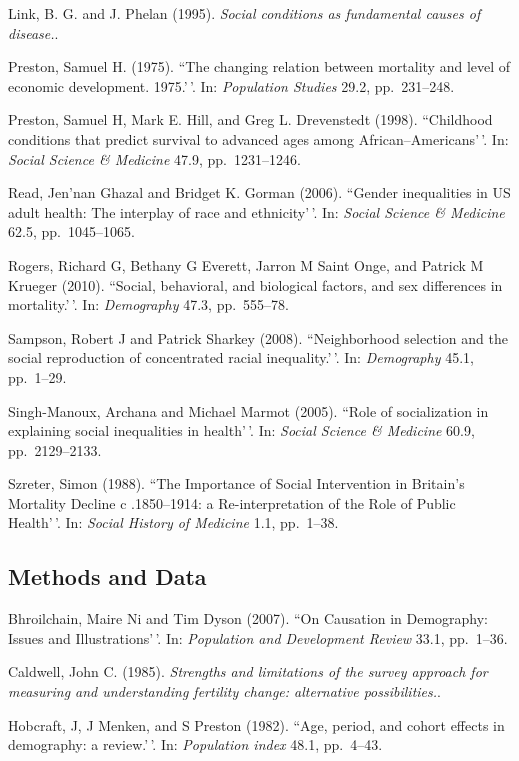 \documentclass[11pt,]{article}
\begin{document}
Link, B. G. and J. Phelan (1995).
\emph{Social conditions as fundamental causes of disease.}.

Preston, Samuel H. (1975). ``The changing relation between mortality and
level of economic development. 1975.'\,'. In: \emph{Population Studies}
29.2, pp.~231--248.

Preston, Samuel H, Mark E. Hill, and Greg L. Drevenstedt (1998).
``Childhood conditions that predict survival to advanced ages among
African--Americans'\,'. In: \emph{Social Science \& Medicine} 47.9,
pp.~1231--1246.

Read, Jen'nan Ghazal and Bridget K. Gorman (2006). ``Gender inequalities
in US adult health: The interplay of race and ethnicity'\,'. In:
\emph{Social Science \& Medicine} 62.5, pp.~1045--1065.

Rogers, Richard G, Bethany G Everett, Jarron M Saint Onge, and Patrick M
Krueger (2010). ``Social, behavioral, and biological factors, and sex
differences in mortality.'\,'. In: \emph{Demography} 47.3, pp.~555--78.

Sampson, Robert J and Patrick Sharkey (2008). ``Neighborhood selection
and the social reproduction of concentrated racial inequality.'\,'. In:
\emph{Demography} 45.1, pp.~1--29.

Singh-Manoux, Archana and Michael Marmot (2005). ``Role of socialization
in explaining social inequalities in health'\,'. In:
\emph{Social Science \& Medicine} 60.9, pp.~2129--2133.

Szreter, Simon (1988). ``The Importance of Social Intervention in
Britain's Mortality Decline c .1850--1914: a Re-interpretation of the
Role of Public Health'\,'. In: \emph{Social History of Medicine} 1.1,
pp.~1--38.

\hypertarget{methods-and-data}{%
\subsection{Methods and Data}\label{methods-and-data}}

Bhroilchain, Maire Ni and Tim Dyson (2007). ``On Causation in
Demography: Issues and Illustrations'\,'. In:
\emph{Population and Development Review} 33.1, pp.~1--36.

Caldwell, John C. (1985).
\emph{Strengths and limitations of the survey approach for measuring and understanding fertility change: alternative possibilities.}.

Hobcraft, J, J Menken, and S Preston (1982). ``Age, period, and cohort
effects in demography: a review.'\,'. In: \emph{Population index} 48.1,
pp.~4--43.
\end{document}
